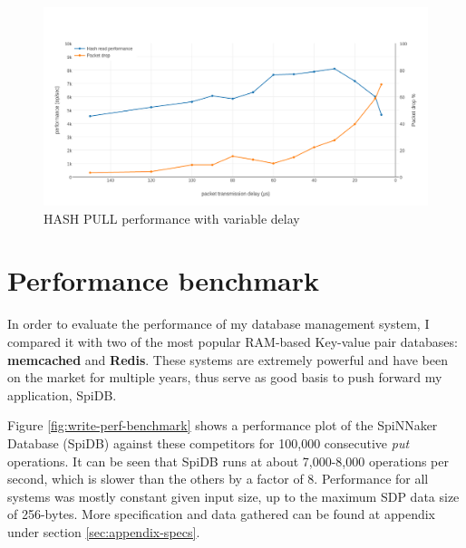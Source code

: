 \begin{figure}
\begin{center}
	\includegraphics[width=1.3\textwidth, natwidth=1063, natheight=550]{images/hash_performance.png}
\end{center}
\caption{HASH PULL performance with variable delay}
\label{fig:hash-performance}
\end{figure}



\section{Performance benchmark}
In order to evaluate the performance of my database management system, I compared it with two of the most popular RAM-based Key-value pair databases: \textbf{memcached}\cite{memcached} and \textbf{Redis}\cite{redis}. These systems are extremely powerful and have been on the market for multiple years, thus serve as good basis to push forward my application, SpiDB.

Figure \ref{fig:write-perf-benchmark} shows a performance plot of the SpiNNaker Database (SpiDB) against these competitors for 100,000 consecutive \textit{put} operations. It can be seen that SpiDB runs at about 7,000-8,000 operations per second, which is slower than the others by a factor of 8. Performance for all systems was mostly constant given input size, up to the maximum SDP data size of 256-bytes. More specification and data gathered can be found at appendix under section \ref{sec:appendix-specs}.

